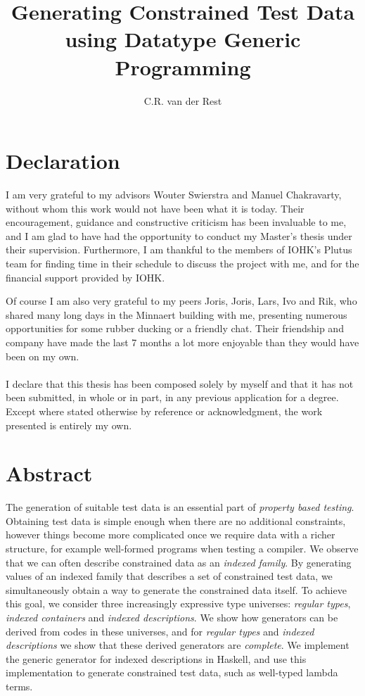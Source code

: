 \documentclass[a4paper,msc,twosized=semi]{uustthesis}
\title{Generating Constrained Test Data using Datatype Generic Programming}
\author{C.R. van der Rest}
\let\oldemph\emph
\renewcommand\emph[1]{{\large\oldemph{#1}}}
\begin{document}
\maketitle


\frontmatter
\tableofcontents

\chapter{Declaration}
I am very grateful to my advisors Wouter Swierstra and Manuel Chakravarty, without whom this work would not have been what it is today. Their encouragement, guidance and constructive criticism has been invaluable to me, and I am glad to have had the opportunity to conduct my Master's thesis under their supervision. Furthermore, I am thankful to the members of IOHK's Plutus team for finding time in their schedule to discuss the project with me, and for the financial support provided by IOHK. 

Of course I am also very grateful to my peers Joris, Joris, Lars, Ivo and Rik, who shared many long days in the Minnaert building with me, presenting numerous opportunities for some rubber ducking or a friendly chat. Their friendship and company have made the last 7 months a lot more enjoyable than they would have been on my own. \\ \\
I declare that this thesis has been composed solely by myself and that it has not been
submitted, in whole or in part, in any previous application for a degree. Except where
stated otherwise by reference or acknowledgment, the work presented is entirely my
own.

\chapter{Abstract}
The generation of suitable test data is an essential part of \emph{property based testing}. Obtaining test data is simple enough when there are no additional constraints, however things become more complicated once we require data with a richer structure, for example well-formed programs when testing a compiler. We observe that we can often describe constrained data as an \emph{indexed family}. By generating values of an indexed family that describes a set of constrained test data, we simultaneously obtain a way to generate the constrained data itself. To achieve this goal, we consider three increasingly expressive type universes: \emph{regular types}, \emph{indexed containers} and \emph{indexed descriptions}. We show how generators can be derived from codes in these universes, and for \emph{regular types} and \emph{indexed descriptions} we show that these derived generators are \emph{complete}. We implement the generic generator for indexed descriptions in Haskell, and use this implementation to generate constrained test data, such as well-typed lambda terms. 
\end{document}
